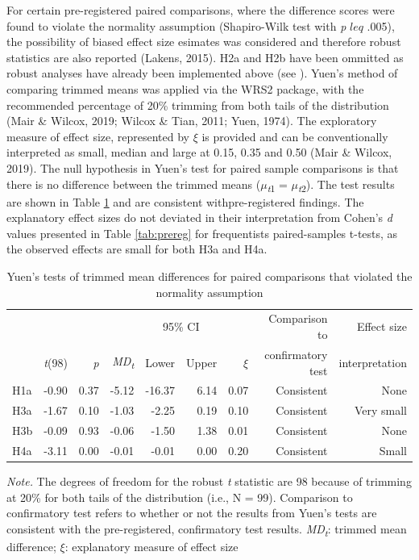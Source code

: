 \documentclass[man,floatsintext]{apa6}
\begin{document}
For certain pre-registered paired comparisons, where the difference scores were found to violate the normality assumption (Shapiro-Wilk test with \emph{p} \(leq\) .005), the possibility of biased effect size esimates was considered and therefore robust statistics are also reported (Lakens, 2015). H2a and H2b have been ommitted as robust analyses have already been implemented above (see \textit{}). Yuen's method of comparing trimmed means was applied via the WRS2 package, with the recommended percentage of 20\% trimming from both tails of the distribution (Mair \& Wilcox, 2019; Wilcox \& Tian, 2011; Yuen, 1974). The exploratory measure of effect size, represented by \(\xi\) is provided and can be conventionally interpreted as small, median and large at 0.15, 0.35 and 0.50 (Mair \& Wilcox, 2019). The null hypothesis in Yuen's test for paired sample comparisons is that there is no difference between the trimmed means (\textit{$\mu$\textsubscript{t}}\textsubscript{1} = \textit{$\mu$\textsubscript{t}}\textsubscript{2}). The test results are shown in Table \ref{tab:robust} and are consistent withpre-registered findings. The explanatory effect sizes do not deviated in their interpretation from Cohen's \emph{d} values presented in Table \ref{tab:prereg} for frequentists paired-samples t-tests, as the observed effects are small for both H3a and H4a.

\begin{table}[h] 
    \centering
    \caption{Yuen's tests of trimmed mean differences for paired comparisons that violated the normality assumption}
    \label{tab:robust}
    {
        \begin{tabular}{lrrrrrrrr}
            \toprule
             &  &  &  & \multicolumn{2}{c}{95\% CI} &  &  Comparison to  & Effect size\\
            \cline{5-6}
             & \textit{t}(98) & \textit{p} & \textit{MD\textsubscript{t}} & Lower & Upper  & \textit{$\xi$} & confirmatory test & interpretation \\
            \cmidrule(r){1-9}
            H1a & -0.90 & 0.37 & -5.12 & -16.37 & 6.14 & 0.07 & Consistent & None\\
            H3a & -1.67 & 0.10 & -1.03 & -2.25 & 0.19 & 0.10 & Consistent & Very small\\
            H3b & -0.09 & 0.93 & -0.06 & -1.50 & 1.38 & 0.01 & Consistent & None \\
            H4a & -3.11 & 0.00 & -0.01 & -0.01 & 0.00 & 0.20 & Consistent & Small \\
            \bottomrule
        \end{tabular}
    }
    \begin{tablenotes}[para]
\footnotesize{\textit{Note.} The degrees of freedom for the robust \textit{t} statistic are 98 because of trimming at 20\% for both tails of the distribution (i.e., N = 99). Comparison to confirmatory test refers to whether or not the results from Yuen's tests are consistent with the pre-registered, confirmatory test results. \textit{MD\textsubscript{t}}: trimmed mean difference; \textit{$\xi$}: explanatory measure of effect size}
\end{tablenotes}
\end{table}
\end{document}
